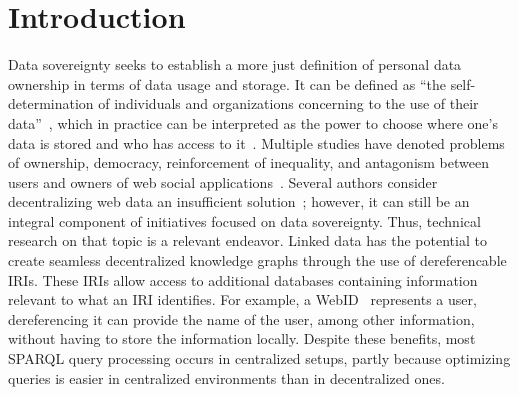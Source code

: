 \section{Introduction}

Data sovereignty seeks to establish a more just definition of personal data ownership in terms of data usage and storage.
It can be defined as ``the self-determination of individuals and organizations concerning to the use of their data''~\cite{verstraete2022solid},
which in practice can be interpreted as the power to choose where one's data is stored and who has access to it~\cite{verstraete2022solid}.
Multiple studies have denoted problems of ownership, democracy, reinforcement of inequality, and antagonism between users and owners of web social applications~\cite{Terranova2000FreeLP, Curran2016ch1, Sevignani2013, 9663788}.
Several authors consider decentralizing web data an insufficient solution~\cite{9663788, Curran2016ch1}; however, it can still be an integral component of initiatives focused on data sovereignty.
Thus, technical research on that topic is a relevant endeavor.
Linked data has the potential to create seamless decentralized knowledge graphs through the use of dereferencable IRIs.
These IRIs allow access to additional databases containing information relevant to what an IRI identifies.
For example, a WebID~ represents a user, dereferencing it can provide the name of the user, among other information, without having to store the information locally.
Despite these benefits, most SPARQL query processing occurs in centralized setups, partly because optimizing queries is easier in centralized environments than in decentralized ones.


